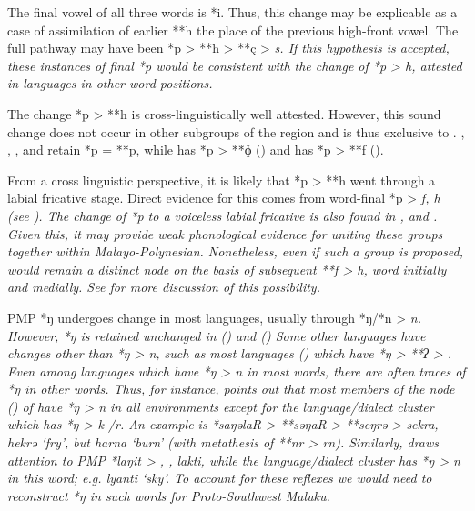 The final vowel of all three words is *i.
Thus, this change may be explicable as a case of assimilation
of earlier **h the place of the previous high-front vowel.
The full pathway may have been *p > **h > **ç > \it{s}.
If this hypothesis is accepted,
these instances of final *p would be consistent with the change
of *p > \it{h,} {\0} attested in  languages
in other word positions.

The change *p > **h is cross-linguistically well attested.
However, this sound change does not occur in other subgroups
of the region and is thus exclusive to .
, , ,
and  retain *p = **p,
while  has *p > **ɸ ()
and  has *p > **f ().

From a cross linguistic perspective,
it is likely that  *p > **h went through a labial fricative stage.
Direct evidence for this comes from  word-final *p > \it{f, h} (see ).
The change of *p to a voiceless labial fricative is also found
in , and .
Given this, it may provide weak phonological evidence for uniting
these groups together within Malayo-Polynesian.
Nonetheless, even if such a group is proposed,
 would remain a distinct node on the basis of
subsequent **f > \it{h,} {\0} word initially and medially.
See  for more discussion of this possibility.

PMP *ŋ undergoes change in most  languages,
usually through *ŋ/*n > \it{n}.
However, *ŋ is retained unchanged in  ()
and  () Some other languages
have changes other than *ŋ > \it{n},
such as most  languages ()
which have *ŋ > **ʔ > {\0}.
Even among languages which have *ŋ > \it{n} in most words,
there are often traces of *ŋ in other words.
Thus, for instance, \citet{Mills2010} points out that most members
of the  node () of  have *ŋ > \it{n} in all environments except for the 
language/dialect cluster which has *ŋ > \it{k} /{\gap}\it{r}.
An example is *saŋəlaR > **səŋaR > **seŋrə >  \it{sekra},
 \it{hekrə} ‘fry’, but  \it{harna} ‘burn’ (with metathesis
of **nr > \it{rn}).
Similarly, \citet{Mills2010} draws attention to PMP *laŋit >
, ,  \it{lakti}, while the  language/dialect cluster
has *ŋ > \it{n} in this word; e.g.  \it{lyanti} ‘sky’.
To account for these reflexes we would need to reconstruct *ŋ
in such words for Proto-Southwest Maluku.

